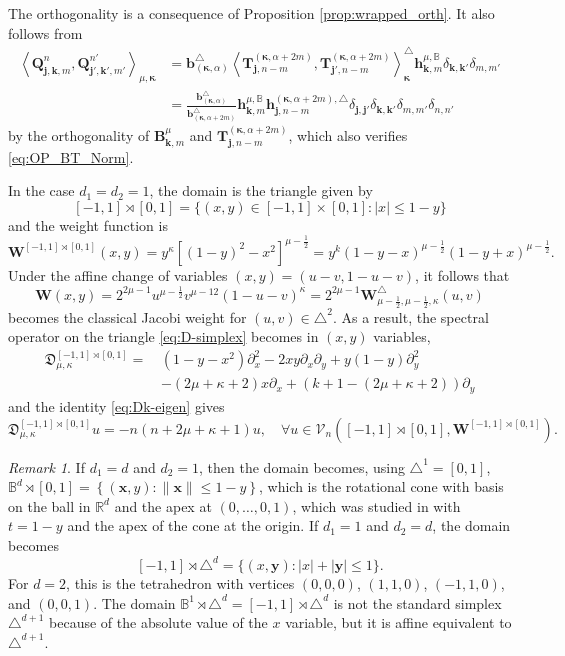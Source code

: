 \documentclass{amsart}
\theoremstyle{remark}
\newtheorem{rem}{Remark}[section]\newtheorem*{notation}{Notation}
\def\fD{{\mathfrak D}}
\def\a{{\alpha}}
\def\k{{\kappa}}
\def\xb{{\bm x}}
\def\yb{{\bm y}}
\def\Wb{{\bm W}}
\def\CV{{\mathcal V}}
\def\BB{{\mathbb B}}
\def\RR{{\mathbb R}}
\def\bk{{\boldsymbol{\kappa}}}
\def\f{\frac}
\begin{document}
The orthogonality is a consequence of Proposition \ref{prop:wrapped_orth}. It also follows from 
\begin{align*}
 \left\langle \bm Q_{\bm j, \bm k, m}^n, \bm Q_{\bm j', \bm k', m'}^{n'} \right\rangle_{\mu, \bk} 
& =\bm b_{(\bk,\a)}^\triangle  \left\langle \bm T_{\bm j, n-m}^{(\bk, \a+2m)}, \bm T_{\bm j', n-m}^{(\bk, \a+2m)} 
    \right\rangle_{\bk}^\triangle   \bm h_{\bm k,m}^{\mu,\BB}  \delta_{\bm k, \bm k'} \delta_{m, m'}  \\
& =  \frac{\bm b^\triangle_{(\bk,\a)}}{\bm b^\triangle_{(\bk, \alpha+2m)}}  \bm h_{\bm k,m}^{\mu,\BB} 
  \bm h_{\bm j,n-m}^{(\bk, \a+2m), \triangle}
 \delta_{\bm j, \bm j'} \delta_{\bm k, \bm k'} \delta_{m, m'} 
  \delta_{n,n'}
\end{align*} 
by the orthogonality of $\bm B_{\bm k, m}^{\mu}$ and $\bm T_{\bm j, n-m}^{(\bk, \alpha +2m)}$, which also  
verifies \eqref{eq:OP_BT_Norm}.  

In the case $d_1 = d_2 =1$, the domain is the triangle given by 
$$
[-1,1]\rtimes [0,1]  = \{(x,y) \in  [-1,1] \times [0,1]: |x| \le 1-y\}
$$
and the weight function is 
$$
   \Wb^{[-1,1]\rtimes [0,1]}(x,y) =  y^\k [(1-y)^2 - x^2]^{\mu-\f12} = y^k (1-y-x)^{\mu-\f12} (1-y+x)^{\mu-\f12}.
$$
Under the affine change of variables $(x,y) = (u-v,1-u-v)$, it follows that
$$
\Wb(x,y) = 2^{2\mu-1} u^{\mu-\f12} v^{\mu-12}(1-u-v)^\k =  2^{2\mu-1}\Wb_{\mu-\f12,\mu-\f12,\k}^\triangle(u,v)
$$
becomes the classical Jacobi weight for $(u,v) \in \triangle^2$. As a result, the spectral operator on the triangle
\eqref{eq:D-simplex} becomes in $(x,y)$ variables, 
\begin{align*}
  \fD_{\mu,\k}^{[-1,1]\rtimes [0,1]} = \, & 
(1-y - x^2) \partial_x^2 - 2 x y \partial_x \partial_y +y(1-y) \partial_y^2 \\
 &   - (2\mu + \k +2) x \partial_x  + (k+1 - (2\mu+\k +2) ) \partial_y
\end{align*}
and the identity \eqref{eq:Dk-eigen} gives 
$$
  \fD_{\mu,\k}^{[-1,1]\rtimes [0,1]} u = - n (n + 2\mu + \k +1) u, \quad \forall u \in \CV_n\! \left([-1,1]\rtimes [0,1],  \Wb^{[-1,1]\rtimes [0,1]}\right).
$$ 

\begin{rem} \label{rem:B-T}
If $d_1=d$ and $d_2 =1$, then the domain becomes, using $\triangle^1 = [0,1]$, 
$\BB^{d}\! \rtimes [0,1]  = \left\{(\xb,y):  \|\xb\| \le 1- y \right\}$, which
is the rotational cone with basis on the ball in $\RR^d$ and the apex at $(0, \ldots, 0, 1)$, which was studied in \cite{X20} 
with $t= 1-y$ and the apex of the cone at the origin. If $d_1=1$ and $d_2 = d$, the domain becomes 
$$
[-1,1] \rtimes \triangle^d = \{ (x,\yb): |x| + |\yb| \le 1 \}. 
$$
For $d= 2$, this is the tetrahedron with vertices $(0,0,0)$, $(1,1,0)$, $(-1,1,0)$, and $(0,0,1)$. The domain 
$\BB^1 \rtimes \triangle^d = [-1,1] \rtimes \triangle^d$ is not the standard simplex $\triangle^{d+1}$ because of the
absolute value of the $x$ variable, but it is affine equivalent to $\triangle^{d+1}$.
\end{rem}
\end{document}

